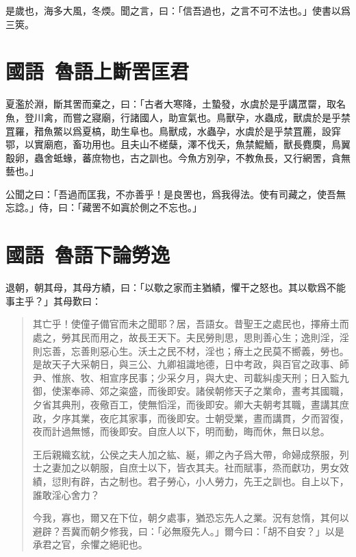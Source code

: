 是歲也，海多大風，冬煗。聞之言，曰：「信吾過也，之言不可不法也。」使書以爲三筴。

\theendnotes

\section[里革斷罟匡君\quad{\small 國語 魯語上}]{{\normalsize 國語\ 魯語上}\quad {}斷罟匡君}
夏濫於淵，斷其罟而棄之，曰：「古者大寒降，土蟄發，水虞於是乎講罛罶，取名魚，登川禽，而嘗之寢廟，行諸國人，助宣氣也。鳥獸孕，水蟲成，獸虞於是乎禁罝羅，矠魚鱉以爲夏槁，助生阜也。鳥獸成，水蟲孕，水虞於是乎禁罝䍡，設穽鄂，以實廟庖，畜功用也。且夫山不槎蘖，澤不伐夭，魚禁鯤鮞，獸長麑䴠，鳥翼鷇卵，蟲舍蚳蝝，蕃庶物也，古之訓也。今魚方別孕，不教魚長，又行網罟，貪無藝也。」

公聞之曰：「吾過而匡我，不亦善乎！是良罟也，爲我得法。使有司藏之，使吾無忘諗。」侍，曰：「藏罟不如寘於側之不忘也。」

\section[敬姜論勞逸\quad{\small 國語 魯語下}]{{\normalsize 國語\ 魯語下}\quad {}論勞逸}
退朝，朝其母，其母方績，曰：「以歜之家而主猶績，懼干之怒也。其以歜爲不能事主乎？」其母歎曰：

\begin{quotation}
其亡乎！使僮子備官而未之聞耶？居，吾語女。昔聖王之處民也，擇瘠土而處之，勞其民而用之，故長王天下。夫民勞則思，思則善心生；逸則淫，淫則忘善，忘善則惡心生。沃土之民不材，淫也；瘠土之民莫不嚮義，勞也。是故天子大采朝日，與三公、九卿祖識地德，日中考政，與百官之政事、師尹、惟旅、牧、相宣序民事；少采夕月，與大史、司載糾虔天刑；日入監九御，使潔奉禘、郊之粢盛，而後即安。諸侯朝修天子之業命，晝考其國職，夕省其典刑，夜儆百工，使無慆淫，而後即安。卿大夫朝考其職，晝講其庶政，夕序其業，夜庀其家事，而後即安。士朝受業，晝而講貫，夕而習復，夜而計過無憾，而後即安。自庶人以下，明而動，晦而休，無日以怠。

王后親織玄紞，公侯之夫人加之紘、綖，卿之內子爲大帶，命婦成祭服，列士之妻加之以朝服，自庶士以下，皆衣其夫。社而賦事，烝而獻功，男女效績，愆則有辟，古之制也。君子勞心，小人勞力，先王之訓也。自上以下，誰敢淫心舍力？

今我，寡也，爾又在下位，朝夕處事，猶恐忘先人之業。況有怠惰，其何以避辟？吾冀而朝夕修我，曰：「必無廢先人。」爾今曰：「胡不自安？」以是承君之官，余懼之絕祀也。
\end{quotation}

